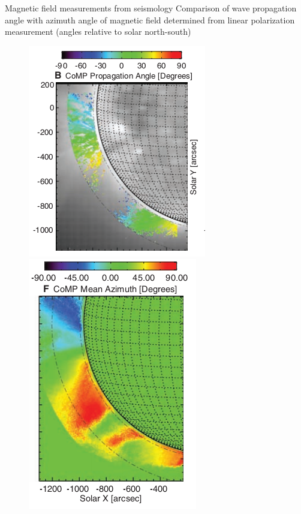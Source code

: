 \documentclass{beamer}
\begin{document}
\begin{frame}{Magnetic field measurements from seismology}
Comparison of wave propagation angle with azimuth angle of magnetic field determined from linear polarization measurement
(angles relative to solar north-south)
\begin{figure}[H]
  \begin{minipage}[c]{0.33\textwidth}
    \includegraphics[scale=0.4]{ts2.png}
  \end{minipage} \hfill
 \begin{minipage}[c]{0.33\textwidth}
    \includegraphics[scale=0.4]{ts1.png}
  \end{minipage}\hfill
 \begin{minipage}[c]{0.33\textwidth}

\end{minipage}
\end{figure}
\end{frame}
\end{document}
